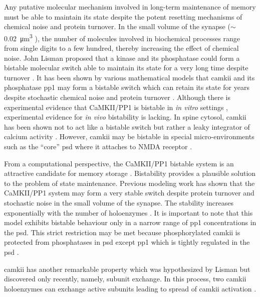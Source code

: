 \documentclass[9pt,lineno,doublespacing]{elife}
\begin{document}
Any putative molecular mechanism involved in long-term maintenance of memory
must be able to maintain its state despite the potent resetting mechanisms of
chemical noise and protein turnover. In the small volume of the synapse ($\sim$
\SI{0.02}{\cubic\micro\meter} \citep{bartol_nanoconnectomic_2015}), the number
of molecules involved in biochemical processes range from single digits to a few
hundred, thereby increasing the effect of chemical noise. John Lisman proposed
that a kinase and its phosphatase could form a bistable molecular switch able to
maintain its state for a very long time despite turnover
\citep{lisman_mechanism_1985}. It has been shown by various mathematical models
that \gls{camkii} and its phosphatase \gls{pp1} may form a bistable switch
\citep{zhabotinsky_bistability_2000} which can retain its state for years
despite stochastic chemical noise and protein turnover
\citep{miller_stability_2005}. Although there is experimental evidence that
CaMKII/PP1 is bistable in \emph{in vitro} settings
\citep{bradshaw_ultrasensitive_2003,urakubo_vitro_2014}, experimental evidence
for \emph{in vivo} bistability is lacking. In spine cytosol, \gls{camkii} has
been shown not to act like a bistable switch but rather a leaky integrator of
calcium activity \citep{chang_camkii_2017}. However, \gls{camkii} may be
bistable in special micro-environments such as the ``core'' \gls{psd} where it
attaches to NMDA receptor \citep{dosemeci_postsynaptic_2016,
petersen_distribution_2003}.

From a computational perspective, the CaMKII/PP1 bistable system is an attractive
candidate for memory storage \citep{koch_biophysics_2004}. Bistability provides
a plausible solution to the problem of state maintenance. Previous modeling work
has shown that the CaMKII/PP1 system may form a very stable switch despite protein 
turnover and stochastic noise in the small volume of the synapse. The stability
increases exponentially with the number of holoenzymes
\citep{miller_stability_2005}. It is important to note that this model exhibits
bistable behaviour only in a narrow range of \gls{pp1} concentrations in the
\gls{psd}. This strict restriction may be met because phosphorylated
\gls{camkii} is protected from phosphatases in \gls{psd} except \gls{pp1}
\citep{strack_differential_1997} which is tightly regulated in the \gls{psd}
\citep{bollen_extended_2010}. 

\gls{camkii} has another remarkable property which was hypothesized by Lisman
\citep{lisman_cam_1994} but discovered only recently, namely, subunit exchange.
In this process, two \gls{camkii} holoenzymes can exchange active subunits
leading to spread of \gls{camkii} activation \citep{stratton_activation-triggered_2014}.
\end{document}
